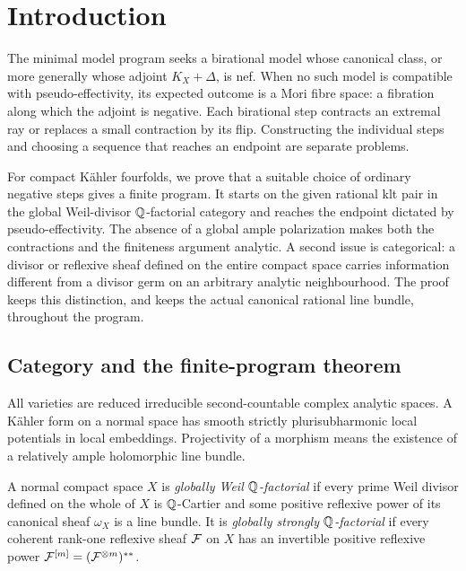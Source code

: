 \section{Introduction}\label{sec:introduction}

The minimal model program seeks a birational model whose canonical
class, or more generally whose adjoint $K_X+\Delta$, is nef. When no
such model is compatible with pseudo-effectivity, its expected outcome
is a Mori fibre space: a fibration along which the adjoint is negative.
Each birational step contracts an extremal ray or replaces a small
contraction by its flip. Constructing the individual steps and choosing
a sequence that reaches an endpoint are separate problems.

For compact Kähler fourfolds, we prove that a suitable choice of ordinary
negative steps gives a finite program. It starts on the given rational
klt pair in the global Weil-divisor $\mathbb Q$-factorial category and reaches
the endpoint dictated by pseudo-effectivity. The absence of a global
ample polarization makes both the contractions and the finiteness
argument analytic. A second issue is categorical: a divisor or reflexive
sheaf defined on the entire compact space carries information different
from a divisor germ on an arbitrary analytic neighbourhood. The proof
keeps this distinction, and keeps the actual canonical rational line
bundle, throughout the program.

\subsection{Category and the finite-program theorem}

All varieties are reduced irreducible second-countable complex analytic
spaces. A Kähler form on a normal space has smooth strictly
plurisubharmonic local potentials in local embeddings. Projectivity of a
morphism means the existence of a relatively ample holomorphic line
bundle.

\begin{definition}\label{def:global-factoriality}\label{def:strong-factoriality}
A normal compact space $X$ is \emph{globally Weil $\mathbb Q$-factorial} if
every prime Weil divisor defined on the whole of $X$ is $\mathbb Q$-Cartier and
some positive reflexive power of its canonical sheaf $\omega_X$ is a line
bundle. It is \emph{globally strongly $\mathbb Q$-factorial} if every coherent
rank-one reflexive sheaf $\mathcal F$ on $X$ has an invertible positive reflexive
power $\mathcal F^{[m]}=(\mathcal F^{\otimes m})^{**}$.
\end{definition}

